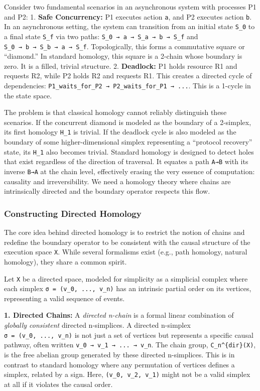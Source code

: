 \documentclass[
]{article}
\begin{document}
Consider two fundamental scenarios in an asynchronous system with
processes P1 and P2: 1. \textbf{Safe Concurrency:} P1 executes action
\texttt{a}, and P2 executes action \texttt{b}. In an asynchronous
setting, the system can transition from an initial state \texttt{S\_0}
to a final state \texttt{S\_f} via two paths:
\texttt{S\_0\ →\ a\ →\ S\_a\ →\ b\ →\ S\_f} and
\texttt{S\_0\ →\ b\ →\ S\_b\ →\ a\ →\ S\_f}. Topologically, this forms a
commutative square or ``diamond.'' In standard homology, this square is
a 2-chain whose boundary is zero. It is a filled, trivial structure. 2.
\textbf{Deadlock:} P1 holds resource R1 and requests R2, while P2 holds
R2 and requests R1. This creates a directed cycle of dependencies:
\texttt{P1\_waits\_for\_P2\ →\ P2\_waits\_for\_P1\ →\ ...}. This is a
1-cycle in the state space.

The problem is that classical homology cannot reliably distinguish these
scenarios. If the concurrent diamond is modeled as the boundary of a
2-simplex, its first homology \texttt{H\_1} is trivial. If the deadlock
cycle is also modeled as the boundary of some higher-dimensional simplex
representing a ``protocol recovery'' state, its \texttt{H\_1} also
becomes trivial. Standard homology is designed to detect holes that
exist regardless of the direction of traversal. It equates a path
\texttt{A→B} with its inverse \texttt{B→A} at the chain level,
effectively erasing the very essence of computation: causality and
irreversibility. We need a homology theory where chains are
intrinsically directed and the boundary operator respects this flow.

\subsubsection{Constructing Directed
Homology}\label{constructing-directed-homology}

The core idea behind directed homology is to restrict the notion of
chains and redefine the boundary operator to be consistent with the
causal structure of the execution space \texttt{X}. While several
formalisms exist (e.g., path homology, natural homology), they share a
common spirit.

Let \texttt{X} be a directed space, modeled for simplicity as a
simplicial complex where each simplex \texttt{σ\ =\ (v\_0,\ ...,\ v\_n)}
has an intrinsic partial order on its vertices, representing a valid
sequence of events.

\textbf{1. Directed Chains:} A \emph{directed n-chain} is a formal
linear combination of \emph{globally consistent} directed n-simplices. A
directed n-simplex \texttt{σ\ =\ (v\_0,\ ...,\ v\_n)} is not just a set
of vertices but represents a specific causal pathway, often written
\texttt{v\_0\ →\ v\_1\ →\ ...\ →\ v\_n}. The chain group,
\texttt{C\_n\^{}\{dir\}(X)}, is the free abelian group generated by
these directed n-simplices. This is in contrast to standard homology
where any permutation of vertices defines a simplex, related by a sign.
Here, \texttt{(v\_0,\ v\_2,\ v\_1)} might not be a valid simplex at all
if it violates the causal order.
\end{document}
